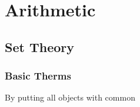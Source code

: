 \section{Arithmetic}
\subsection{Set Theory}
\subsubsection{Basic Therms}
By putting all objects with common 